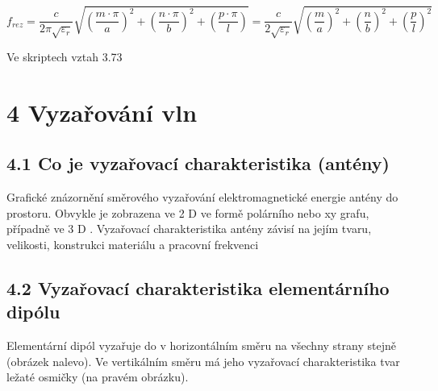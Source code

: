 \documentclass[10pt]{article}
\begin{document}
$$
f_{r e z}=\frac{c}{2 \pi \sqrt{\varepsilon_{r}}} \sqrt{\left(\frac{m \cdot \pi}{a}\right)^{2}+\left(\frac{n \cdot \pi}{b}\right)^{2}+\left(\frac{p \cdot \pi}{l}\right)}=\frac{c}{2 \sqrt{\varepsilon_{r}}} \sqrt{\left(\frac{m}{a}\right)^{2}+\left(\frac{n}{b}\right)^{2}+\left(\frac{p}{l}\right)^{2}}
$$

Ve skriptech vztah 3.73

\section*{4 Vyzařování vln}
\subsection*{4.1 Co je vyzařovací charakteristika (antény)}
Grafické znázornění směrového vyzařování elektromagnetické energie antény do prostoru. Obvykle je zobrazena ve 2 D ve formě polárního nebo xy grafu, případně ve 3 D . Vyzařovací charakteristika antény závisí na jejím tvaru, velikosti, konstrukci materiálu a pracovní frekvenci

\subsection*{4.2 Vyzařovací charakteristika elementárního dipólu}
Elementární dipól vyzařuje do v horizontálním směru na všechny strany stejně (obrázek nalevo). Ve vertikálním směru má jeho vyzařovací charakteristika tvar ležaté osmičky (na pravém obrázku).
\end{document}
